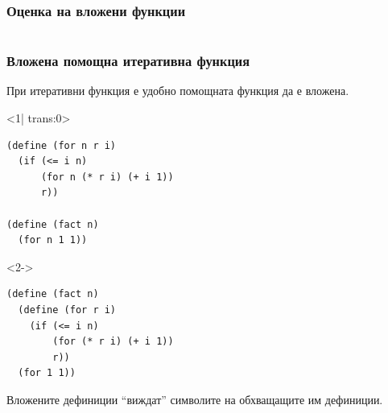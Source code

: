 \documentclass[alsotrans]{beamerswitch}
\begin{document}
\begin{frame}
  \frametitle{Оценка на вложени функции}

  \sizeboth\scriptsize
  \begin{fixedarea}
    \begin{columns}[T,onlytextwidth]
      \begin{column}{.5\textwidth}
      \end{column}
      \begin{column}{.5\textwidth}
      \end{column}
    \end{columns}
  \end{fixedarea}
\end{frame}

\begin{frame}[fragile]
  \frametitle{Вложена помощна итеративна функция}

  При итеративни функция е удобно помощната функция да е вложена.
  \begin{fixedarea}[.5]
    \begin{onlyenv}<1| trans:0>
\begin{lstlisting}
(define (for n r i)
  (if (<= i n)
      (for n (* r i) (+ i 1))
      r))

(define (fact n)
  (for n 1 1))
\end{lstlisting}
    \end{onlyenv}
    \begin{onlyenv}<2->
\begin{lstlisting}
(define (fact n)
  (define (for r i)
    (if (<= i n)
        (for (* r i) (+ i 1))
        r))
  (for 1 1))
\end{lstlisting}
    \end{onlyenv}
  \end{fixedarea}
  Вложените дефиниции ``виждат'' символите на обхващащите им дефиниции.
\end{frame}
\end{document}
